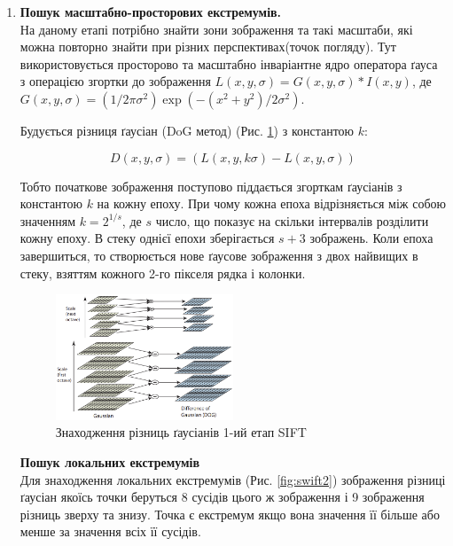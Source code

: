 \begin{enumerate}
    \item \textbf{Пошук масштабно-просторових екстремумів.}\\
          На даному етапі потрібно знайти зони зображення та такі масштаби, які можна повторно
          знайти при різних перспективах(точок погляду). Тут використовується просторово та
          масштабно інваріантне ядро оператора ґауса з операцією згортки
          до зображення $L(x,y,\sigma) = G(x,y,\sigma) \ast I(x,y)$,
          де $G(x,y,\sigma) = (1/2\pi\sigma^2)\exp({-(x^2+y^2)/2\sigma^2})$.


          Будується різниця ґаусіан (DoG метод) (Рис. \ref{fig:swift1}) з константою $k$:

          \begin{equation*}
              D(x,y,\sigma) = (L(x,y,k\sigma) - L(x,y,\sigma))
          \end{equation*}

          Тобто початкове зображення поступово піддається згорткам ґаусіанів з константою
          $k$ на кожну епоху. При чому кожна епоха відрізняється між собою значенням $k = 2^{1/s}$,
          де $s$ число, що показує на скільки інтервалів розділити кожну епоху.
          В стеку однієї епохи зберігається $s+3$ зображень. Коли епоха завершиться, то
          створюється нове ґаусове зображення з двох найвищих в стеку,
          взяттям кожного 2-го пікселя рядка і колонки.

          \begin{figure}[H]
              \centering
              \includegraphics[width=0.5\textwidth]{images/sift1}
              \caption{Знаходження різниць ґаусіанів 1-ий етап SIFT \cite{sift}
                  \label{fig:swift1}
              }
          \end{figure}

          \subitem \textbf{Пошук локальних екстремумів} \\
          Для знаходження локальних екстремумів (Рис. \ref{fig:swift2}) зображення
          різниці ґаусіан якоїсь точки беруться 8 сусідів цього ж зображення і 9 зображення
          різниць зверху та знизу. Точка є екстремум якщо вона значення її більше або менше за
          значення всіх її сусідів.


\end{enumerate}
